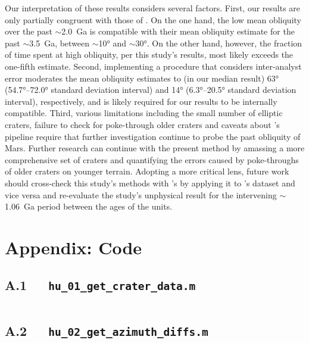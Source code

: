 \documentclass{ucetd}
\begin{document}
Our interpretation of these results considers several factors. First, our results are only partially congruent with those of \citet{holo2018a}. On the one hand, the low mean obliquity over the past $\sim$2.0~Ga is compatible with their mean obliquity estimate for the past $\sim$3.5~Ga, between $\sim$10° and $\sim$30°. On the other hand, however, the fraction of time spent at high obliquity, per this study’s results, most likely exceeds the one-fifth estimate. Second, implementing a procedure that considers inter-analyst error moderates the mean obliquity estimates to (in our median result) 63° (54.7°--72.0° standard deviation interval) and 14° (6.3°--20.5° standard deviation interval), respectively, and is likely required for our results to be internally compatible. Third, various limitations including the small number of elliptic craters, failure to check for poke-through older craters and caveats about \citet{holo2018a}’s pipeline require that further investigation continue to probe the past obliquity of Mars. Further research can continue with the present method by amassing a more comprehensive set of craters and quantifying the errors caused by poke-throughs of older craters on younger terrain. Adopting a more critical lens, future work should cross-check this study’s methods with \citet{holo2018a}’s by applying it to \citet{holo2018a}’s dataset and vice versa and re-evaluate the study’s unphysical result for the intervening $\sim$1.06~Ga period between the ages of the units.


\makebibliography
\nocite{*}

\chapter*{Appendix: Code}

\section*{A.1\ \ \ \texttt{hu\_01\_get\_crater\_data.m}}
\inputminted{matlab}{code/hu_01_get_crater_data.m}

\section*{A.2\ \ \ \texttt{hu\_02\_get\_azimuth\_diffs.m}}
\inputminted{matlab}{code/hu_02_get_azimuth_diffs.m}
\end{document}
